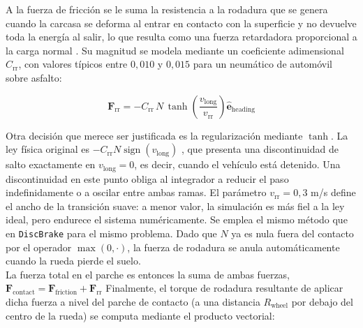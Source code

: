 A la fuerza de fricción se le suma la resistencia a la rodadura que se genera cuando la carcasa se deforma al entrar en contacto con la superficie y no devuelve toda la energía al salir, lo que resulta como una fuerza retardadora proporcional a la carga normal \cite{gillespie1992}. Su magnitud se modela mediante un coeficiente adimensional $C_\text{rr}$, con valores típicos entre $0{,}010$ y $0{,}015$ para un neumático de automóvil sobre asfalto:

\begin{equation}
    \mathbf{F}_\text{rr} = -C_\text{rr}\, N \, \tanh\!\left(\frac{v_\text{long}}{v_\text{rr}}\right) \hat{\mathbf{e}}_\text{heading}
\end{equation}


Otra decisión que merece ser justificada es la regularización mediante $\tanh$. La ley física original es $-C_\text{rr} N \operatorname{sign}(v_\text{long})$ \cite{gillespie1992}, que presenta una discontinuidad de salto exactamente en $v_\text{long} = 0$, es decir, cuando el vehículo está detenido. Una discontinuidad en este punto obliga al integrador a reducir el paso indefinidamente o a oscilar entre ambas ramas. El parámetro $v_\text{rr} = 0{,}3$ m/s define el ancho de la transición suave: a menor valor, la simulación es más fiel a la ley ideal, pero endurece el sistema numéricamente. Se emplea el mismo método que en \verb|DiscBrake| para el mismo problema. Dado que $N$ ya es nula fuera del contacto por el operador $\max(0, \cdot)$, la fuerza de rodadura se anula automáticamente cuando la rueda pierde el suelo.\\

La fuerza total en el parche es entonces la suma de ambas fuerzas, $\mathbf{F}_\text{contact} = \mathbf{F}_\text{friction} + \mathbf{F}_\text{rr}$ Finalmente, el torque de rodadura resultante de aplicar dicha fuerza a nivel del parche de contacto (a una distancia $R_\text{wheel}$ por debajo del centro de la rueda) se computa mediante el producto vectorial:

